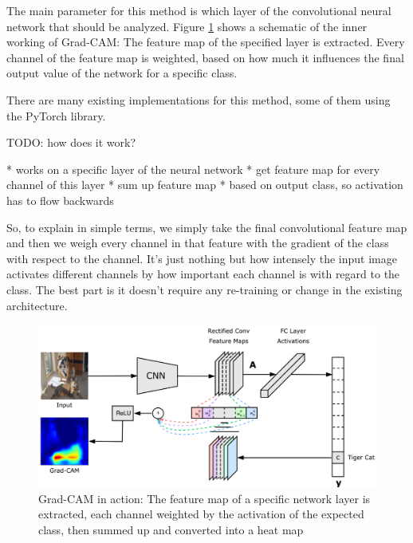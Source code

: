 The main parameter for this method is which layer of the convolutional neural network that should be analyzed. Figure \ref{grad_cam_explanation} shows a schematic of the inner working of Grad-CAM: The feature map of the specified layer is extracted. Every channel of the feature map is weighted, based on how much it influences the final output value of the network for a specific class.



There are many existing implementations for this method, some of them using the PyTorch library.

TODO: how does it work?


* works on a specific layer of the neural network
* get feature map for every channel of this layer
* sum up feature map
* based on output class, so activation has to flow backwards

So, to explain in simple terms, we simply take the final convolutional feature map and then we weigh every channel in that feature with the gradient of the class with respect to the channel. It’s just nothing but how intensely the input image activates different channels by how important each channel is with regard to the class. The best part is it doesn’t require any re-training or change in the existing architecture.


\begin{figure}[H]
\centering
\includegraphics[width=12cm]{chapters/02_methods/images/grad-cam.png}
\caption{Grad-CAM in action: The feature map of a specific network layer is extracted, each channel weighted by the activation of the expected class, then summed up and converted into a heat map}
\label{grad_cam_explanation}
\end{figure}

